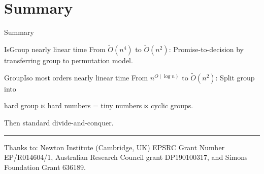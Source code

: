 \documentclass{beamer}
\begin{document}






\section{Summary}

\begin{frame}{Summary}

\begin{block}{IsGroup nearly linear time}
    From $\tilde{O}(n^4)$ to $\tilde{O}(n^2)$: 
    Promise-to-decision by transferring group to permutation model.
\end{block}

\begin{block}{GroupIso most orders nearly linear time}
    From $n^{O(\log n)}$ to $\tilde{O}(n^2)$: 
    Split group into
    \begin{center} 
        hard group $\ltimes$ hard numbers 
        = tiny numbers $\ltimes$ cyclic groups.
    \end{center}
    Then standard divide-and-conquer.
\end{block}

\rule{\textwidth}{1pt}
{\tiny Thanks to: Newton Institute (Cambridge, UK) 
EPSRC Grant Number EP/R014604/1, Australian Research Council grant
DP190100317, and Simons Foundation Grant 636189.}
\end{frame}
\end{document}
